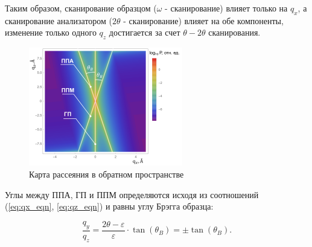 Таким образом, сканирование образцом ($\omega$ - сканирование) влияет только на $q_x$, а
сканирование анализатором ($2\theta$ - сканирование) влияет на обе компоненты,
 изменение только одного $q_z$ достигается за счет $\theta-2\theta$ сканирования.

\begin{figure}[H]
  \centering
  \includegraphics[width=0.6\textwidth]{images/triple_map_reciprocal_space.png}
  \caption{Карта рассеяния в обратном пространстве}
  \label{ris:triple_map_reciprocal_space}
\end{figure}

Углы между ППА, ГП и ППМ определяются исходя из соотношений (\ref{eq:qx_eqn}, \ref{eq:qz_eqn}) и равны углу Брэгга образца:

\begin{equation}
  \frac{q_y}{q_z} = \frac{2\theta - \varepsilon}{\varepsilon} \cdot \tan (\theta_B) = \pm \tan (\theta_B).
  \label{eq:qz_eqn}
\end{equation}
